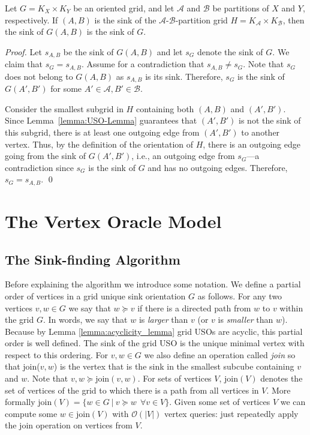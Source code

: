 \documentclass[runningheads,a4paper]{llncs}
\newcommand{\A}{\ensuremath{\mathcal A}}
\newcommand{\B}{\ensuremath{\mathcal B}}
\newcommand{\s}[1]{\ensuremath{s_{\scriptscriptstyle#1}}}
\newcommand{\join}{\mbox{join}\xspace}
\begin{document}
\begin{theorem}
\label{thm:the_sink_of_the_sink_of_the_induced_orientation_is_the_global_sink}

Let $G = K_X \times K_Y$ be an oriented grid,
and let $\A$ and $\B$ be partitions of $X$ and $Y$, respectively.
If $(A,B)$ is the sink of the $\A$-$\B$-partition grid $H = K_\A \times K_\B$, then the sink of $G(A,B)$ is the sink of $G$.
\end{theorem}
\begin{proof}
Let $\s{A,B}$ be the sink of $G(A,B)$ and let $\s{G}$ denote the sink of $G$.
We claim that $\s{G} = \s{A,B}$.
Assume for a contradiction that $\s{A,B}\neq \s{G}$.
Note that $\s{G}$ does not belong to $G(A,B)$ as $\s{A,B}$ is its sink.
Therefore, $\s{G}$ is the sink of $G(A', B')$ for some $A'\in \A, B'\in \B$.

Consider the smallest subgrid in $H$ containing both $(A,B)$ and $(A', B')$. 
Since Lemma~\ref{lemma:USO-Lemma} guarantees that $(A',B')$ is not the sink of this subgrid, there is at least one outgoing edge from $(A',B')$ to another vertex.
Thus, by the definition of the orientation of $H$, there is an outgoing edge going from the sink of $G(A',B')$, i.e., an outgoing edge from $\s{G}$---a contradiction since $\s{G}$ is the sink of $G$ and has no outgoing edges. 
Therefore, $\s{G} = \s{A,B}$. \qed
\end{proof}


\section{The Vertex Oracle Model}
\label{section:The vertex oracle model}

\subsection{The Sink-finding Algorithm}
\label{section:the_sink_finding_algorithm}

Before explaining the algorithm we introduce some notation. We define a partial order of vertices in a grid unique sink orientation $G$ as follows. 
For any two vertices $v,w \in G$ we say that $w \succeq v$ if there is a directed path from $w$ to $v$ within the grid $G$. In words, we say that $w$ is \emph{larger} than $v$ (or $v$ is \emph{smaller} than $w$).
Because by Lemma \ref{lemma:acyclicity_lemma} grid USOs are acyclic, this partial order is well defined.
The sink of the grid USO is the unique minimal vertex with respect to this ordering. For $v,w \in G$ we also define an operation called \emph{\join} so that \join($v,w$) is the vertex that is the sink in the smallest subcube containing $v$ and $w$. Note that $v,w \succeq \join(v,w)$. For sets of vertices $V$, $\join(V)$ denotes the set of vertices of the grid to which there is a path from all vertices in $V$. More formally $\join(V) = \{w \in G \: | \: v \succeq w \:\: \forall v \in V \}$. Given some set of vertices $V$ we can compute some $w \in \join(V)$ with $\mathcal{O}(|V|)$ vertex queries: just repeatedly apply the $\join$ operation on vertices from $V$.
\end{document}
